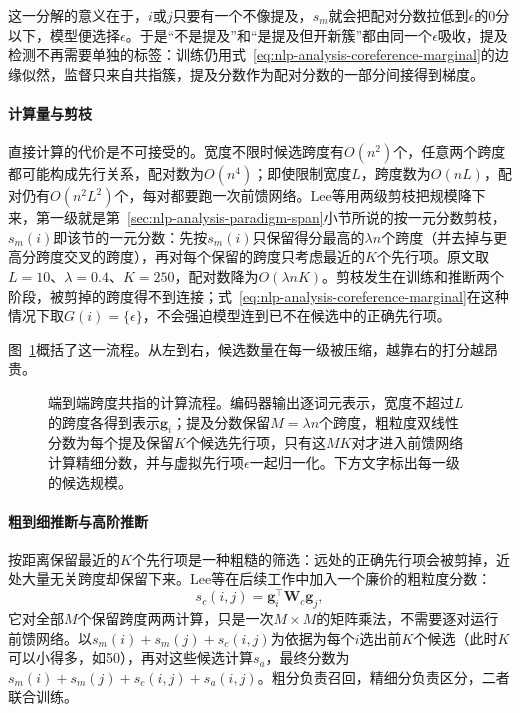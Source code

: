 这一分解的意义在于，$i$或$j$只要有一个不像提及，$s_m$就会把配对分数拉低到$\epsilon$的0分以下，模型便选择$\epsilon$。于是“不是提及”和“是提及但开新簇”都由同一个$\epsilon$吸收，提及检测不再需要单独的标签：训练仍用式~\eqref{eq:nlp-analysis-coreference-marginal}的边缘似然，监督只来自共指簇，提及分数作为配对分数的一部分间接得到梯度。

\paragraph{计算量与剪枝}
直接计算的代价是不可接受的。宽度不限时候选跨度有$O(n^2)$个，任意两个跨度都可能构成先行关系，配对数为$O(n^4)$；即使限制宽度$L$，跨度数为$O(nL)$，配对仍有$O(n^2L^2)$个，每对都要跑一次前馈网络。Lee等用两级剪枝把规模降下来，第一级就是第~\ref{sec:nlp-analysis-paradigm-span}小节所说的按一元分数剪枝，$s_m(i)$即该节的一元分数：先按$s_m(i)$只保留得分最高的$\lambda n$个跨度（并去掉与更高分跨度交叉的跨度），再对每个保留的跨度只考虑最近的$K$个先行项。原文取$L=10$、$\lambda=0.4$、$K=250$，配对数降为$O(\lambda nK)$。剪枝发生在训练和推断两个阶段，被剪掉的跨度得不到连接；式~\eqref{eq:nlp-analysis-coreference-marginal}在这种情况下取$G(i)=\{\epsilon\}$，不会强迫模型连到已不在候选中的正确先行项。

图~\ref{fig:nlp-analysis-span-coreference}概括了这一流程。从左到右，候选数量在每一级被压缩，越靠右的打分越昂贵。

\begin{figure}[htbp]
  \centering
  
  \caption{端到端跨度共指的计算流程。编码器输出逐词元表示，宽度不超过$L$的跨度各得到表示$\bm g_i$；提及分数保留$M=\lambda n$个跨度，粗粒度双线性分数为每个提及保留$K$个候选先行项，只有这$MK$对才进入前馈网络计算精细分数，并与虚拟先行项$\epsilon$一起归一化。下方文字标出每一级的候选规模。}
  \label{fig:nlp-analysis-span-coreference}
\end{figure}

\paragraph{粗到细推断与高阶推断}
按距离保留最近的$K$个先行项是一种粗糙的筛选：远处的正确先行项会被剪掉，近处大量无关跨度却保留下来。Lee等在后续工作中加入一个廉价的粗粒度分数\cite{nlp-analysis-lee2018higher}：
\begin{equation}
  s_c(i,j)=\bm g_i^{\top}\bm W_c\bm g_j,
  \label{eq:nlp-analysis-coarse-score}
\end{equation}
它对全部$M$个保留跨度两两计算，只是一次$M\times M$的矩阵乘法，不需要逐对运行前馈网络。以$s_m(i)+s_m(j)+s_c(i,j)$为依据为每个$i$选出前$K$个候选（此时$K$可以小得多，如50），再对这些候选计算$s_a$，最终分数为$s_m(i)+s_m(j)+s_c(i,j)+s_a(i,j)$。粗分负责召回，精细分负责区分，二者联合训练。

